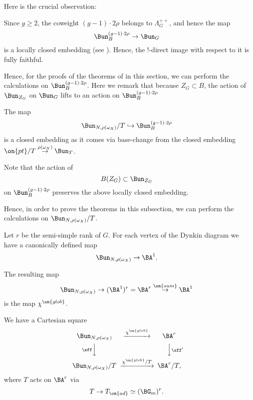 \documentclass[9pt]{amsart}
\theoremstyle{remark}
\theoremstyle{definition}
\theoremstyle{remark}
\numberwithin{equation}{section}
\begin{document}
\sssec{}

Here is the crucial observation:

\medskip

Since $g\geq 2$, the coweight $(g-1)\cdot 2\rho$ belongs to $\Lambda_G^{++}$, and hence the map
$$\Bun^{(g-1)\cdot 2\rho}_B\to \Bun_G$$
is a locally closed embedding (see \cite[Theorem 7.4.3(1')]{DG}). Hence, the !-direct image with respect to it
is fully faithful.

\medskip

Hence, for the proofs of the theorems of in this section, we can perform the calculations on $\Bun^{(g-1)\cdot 2\rho}_B$. 
Here we remark that
because $Z_G\subset B$, the action of $\Bun_{Z_G}$ on $\Bun_G$ lifts to an action on $\Bun^{(g-1)\cdot 2\rho}_B$

 \label{ss:proof of end Poinc}

\sssec{}

The map
\begin{equation} \label{e:Bun N mod T}
\Bun_{N,\rho(\omega_X)}/T\hookrightarrow \Bun^{(g-1)\cdot 2\rho}_B
\end{equation}
is a closed embedding as it comes via base-change from the closed embedding
$\on{pt}/T \overset{\rho(\omega_X)}{\rightarrow} \Bun_T$.

\medskip

Note that the action of 
$$B(Z_G)\subset \Bun_{Z_G}$$
on $\Bun^{(g-1)\cdot 2\rho}_B$ preserves the above locally closed embedding.

\medskip

Hence, in order to prove the theorems in this subsection, we can perform 
the calculations on $\Bun_{N,\rho(\omega_X)}/T$.

\sssec{}

Let $r$ be the semi-simple rank of $G$. For each vertex of the Dynkin diagram we have a canonically
defined map
$$\Bun_{N,\rho(\omega_X)} \to \BA^1.$$

The resulting map
$$\Bun_{N,\rho(\omega_X)} \to (\BA^1)^r=\BA^r \overset{\on{sum}}\to \BA^1$$
is the map $\chi^{\on{glob}}$. 

\medskip

We have a Cartesian square
\begin{equation} \label{e:res diag}
\CD
\Bun_{N,\rho(\omega_X)} @>{\chi^{\on{glob}}}>> \BA^r \\
@V{\sff}VV @VV{\sff'}V \\
\Bun_{N,\rho(\omega_X)}/T @>{\chi^{\on{glob}}/T}>> \BA^r/T,
\endCD
\end{equation} 
where 
$T$ acts on $\BA^r$ via
$$T\to T_{\on{ad}}\simeq (\BG_m)^r.$$
\end{document}
